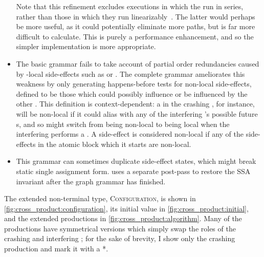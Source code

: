 \begin{itemize}
  Note that this refinement excludes executions in which the
  {\StateMachines} run in series, rather than those in which they run
  linearizably~\cite{Herlihy1990}.  The latter would perhaps be more
  useful, as it could potentially eliminate more paths, but is far
  more difficult to calculate.  This is purely a performance
  enhancement, and so the simpler implementation is more appropriate.
\item The basic grammar fails to take account of partial order
  redundancies caused by {\StateMachine}-local side-effects such as
   or \stAssert.  The complete grammar ameliorates this
  weakness by only generating happens-before tests for non-local
  side-effects, defined to be those which could possibly influence or
  be influenced by the other {\StateMachine}.  This definition is
  context-dependent: a  in the crashing {\StateMachine},
  for instance, will be non-local if it could alias with any of the
  interfering {\StateMachine}'s possible future s, and so
  might switch from being non-local to being local when the
  interfering {\StateMachine} performs a .  A
  {\stStartAtomic} side-effect is considered non-local if any of the
  side-effects in the atomic block which it starts are non-local.
\item This grammar can sometimes duplicate side-effect states, which
  might break static single assignment form.  {\Technique} uses a
  separate post-pass to restore the SSA invariant after the graph
  grammar has finished.
\end{itemize}
The extended non-terminal type, \textsc{Configuration}, is shown in
\autoref{fig:cross_product:configuration}, its initial value in
\autoref{fig:cross_product:initial}, and the extended productions in
\autoref{fig:cross_product:algorithm}.  Many of the productions have
symmetrical versions which simply swap the roles of the crashing and
interfering {\StateMachines}; for the sake of brevity, I show only the
crashing {\StateMachine} production and mark it with a *.

